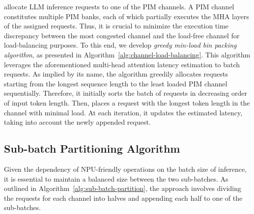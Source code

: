 \neupims allocate LLM inference requests to one of the PIM channels.
%
A PIM channel constitutes multiple PIM banks, each of which partially executes the MHA layers of the assigned requests.
%
%
Thus, it is crucial to minimize the execution time discrepancy between the most congested channel and the load-free channel for load-balancing purposes. 
%
To this end, we develop \emph{greedy min-load bin packing algorithm}, as presented in Algorithm~\ref{alg:channel-load-balancing}.
%
This algorithm leverages the aforementioned multi-head attention latency estimation to batch requests. 
%
As implied by its name, the algorithm greedily allocates requests starting from the longest sequence length to the least loaded PIM channel sequentially.
%
Therefore, it initially sorts the batch of requests in decreasing order of input token length. 
%
Then, \neupims places a request with the longest token length in the channel with minimal load. 
%
At each iteration, it updates the estimated latency, taking into account the newly appended request.
%


\subsection{Sub-batch Partitioning Algorithm}
\label{subsec:sub-batch-partition}
%
Given the dependency of NPU-friendly operations on the batch size of inference, it is essential to maintain a balanced size between the two sub-batches. 
%
As outlined in Algorithm~\ref{alg:sub-batch-partition}, the approach involves dividing the requests for each channel into halves and appending each half to one of the sub-batches.
%